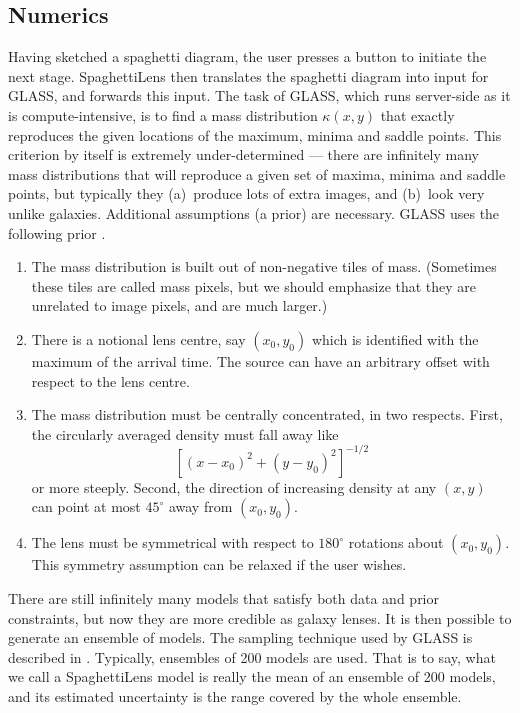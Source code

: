 \documentclass[usenatbib]{mn2e}
\newcommand{\spl}{SpaghettiLens\xspace}
\begin{document}

\subsection{Numerics}

Having sketched a spaghetti diagram, the user presses a button to
initiate the next stage.  \spl then translates the spaghetti diagram
into input for GLASS, and forwards this input.  The task of GLASS,
which runs server-side as it is compute-intensive, is to find a mass
distribution $\kappa(x,y)$ that exactly reproduces the given locations
of the maximum, minima and saddle points. This criterion by itself is
extremely under-determined --- there are infinitely many mass
distributions that will reproduce a given set of maxima, minima and
saddle points, but typically they (a)~produce lots of extra images,
and (b)~look very unlike galaxies.  Additional assumptions (a prior)
are necessary.  GLASS uses the following prior
\citep[cf.][]{1997MNRAS.292..148S,2008ApJ...679...17C}.
\begin{enumerate}
\item The mass distribution is built out of non-negative tiles of
  mass.  (Sometimes these tiles are called mass pixels, but we should
  emphasize that they are unrelated to image pixels, and are much
  larger.)
\item There is a notional lens centre, say $(x_0,y_0)$ which is
  identified with the maximum of the arrival time.  The source can
  have an arbitrary offset with respect to the lens centre.
\item The mass distribution must be centrally concentrated, in two
  respects.  First, the circularly averaged density must fall away
  like $$ \left[(x-x_0)^2+(y-y_0)^2\right]^{-1/2}$$ or more steeply.
  Second, the direction of increasing density at any $(x,y)$ can point
  at most $45^\circ$ away from $(x_0,y_0)$.
\item The lens must be symmetrical with respect to $180^\circ$ rotations
  about $(x_0,y_0)$.  This symmetry assumption can be relaxed if the
  user wishes.
\end{enumerate}
There are still infinitely many models that satisfy both data and
prior constraints, but now they are more credible as galaxy lenses.
It is then possible to generate an ensemble of models.  The sampling
technique used by GLASS is described in \citep{Lubini2012}.
Typically, ensembles of 200 models are used.  That is to say, what we
call a \spl model is really the mean of an ensemble of 200 models, and
its estimated uncertainty is the range covered by the whole ensemble.
\end{document}
